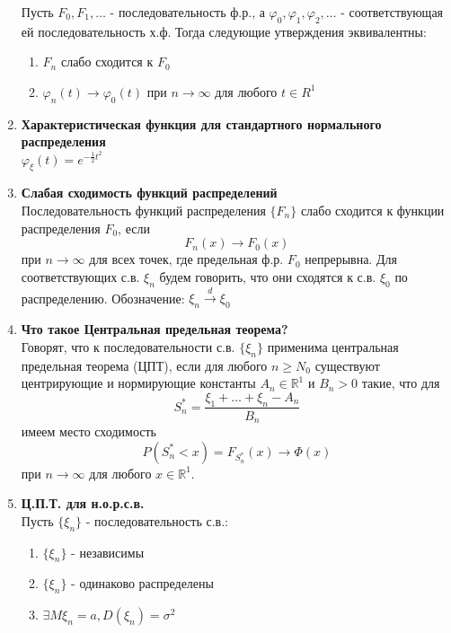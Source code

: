 \documentclass[A4]{article}
\begin{document}
\begin{enumerate}
	Пусть $F_0,F_1,\ldots$ - последовательность ф.р., а $\varphi_0,\varphi_1,\varphi_2,\ldots$ - соответствующая ей последовательность х.ф. Тогда следующие утверждения эквивалентны:
	\begin{enumerate}
		\item $F_n$ слабо сходится к $F_0$
		\item $\varphi_n(t)\rightarrow\varphi_0(t)$ при $n\rightarrow\infty$ для любого $t\in R^1$
 	\end{enumerate}
	\item \textbf{Характеристическая функция для стандартного нормального распределения}\\
	$\varphi_{\xi}(t)=e^{-\frac{1}{2}t^2}$
	\item \textbf{Слабая сходимость функций распределений}\\
	Последовательность функций распределения $\{F_n\}$ слабо сходится к функции распределения $F_0$, если 
	\begin{equation}
	F_n(x)\rightarrow F_0(x)
	\end{equation}
	при $n\rightarrow\infty$ для всех точек, где предельная ф.р. $F_0$ непрерывна. Для соответствующих с.в. $\xi_n$ будем говорить, что они сходятся к с.в. $\xi_0$ по распределению. Обозначение: $\xi_n\stackrel{d}{\rightarrow}\xi_0$
	\item \textbf{Что такое Центральная предельная теорема?}\\
	Говорят, что к последовательности с.в. $\{\xi_n\}$ применима центральная предельная теорема (ЦПТ), если для любого $n\ge N_0$ существуют центрирующие и нормирующие константы $A_n\in \mathbb{R}^1$ и $B_n>0$ такие, что для 
	\begin{equation}
	S_n^*=\frac{\xi_1+\ldots+\xi_n-A_n}{B_n}
	\end{equation} 
	имеем место сходимость
	\begin{equation}
	P(S_n^*<x)=F_{S_n^*}(x)\rightarrow \Phi(x)
	\end{equation}
	при $n\rightarrow\infty$ для любого $x\in \mathbb{R}^1$.
	\item \textbf{Ц.П.Т. для н.о.р.с.в.}\\
	Пусть $\{\xi_n\}$ - последовательность с.в.:
	\begin{enumerate}
		\item $\{\xi_n\}$ - независимы
		\item $\{\xi_n\}$ - одинаково распределены
		\item $\exists M\xi_n=a,D(\xi_n)=\sigma^2$
	\end{enumerate}

\end{enumerate}
\end{document}
